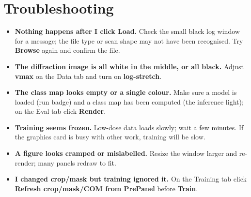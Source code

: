 \documentclass[11pt]{article}
\newcommand{\btn}[1]{\textbf{#1}}
\begin{document}
\section{Troubleshooting}
\begin{itemize}[itemsep=3pt]
\item \textbf{Nothing happens after I click Load.} Check the small black log
window for a message; the file type or scan shape may not have been recognised.
Try \btn{Browse} again and confirm the file.
\item \textbf{The diffraction image is all white in the middle, or all black.}
Adjust \textbf{vmax} on the Data tab and turn on \textbf{log-stretch}.
\item \textbf{The class map looks empty or a single colour.} Make sure a model is
loaded (run badge) and a class map has been computed (the inference light); on the
Eval tab click \btn{Render}.
\item \textbf{Training seems frozen.} Low-dose data loads slowly; wait a few
minutes. If the graphics card is busy with other work, training will be slow.
\item \textbf{A figure looks cramped or mislabelled.} Resize the window larger and
re-render; many panels redraw to fit.
\item \textbf{I changed crop/mask but training ignored it.} On the Training tab
click \btn{Refresh crop/mask/COM from PrePanel} before \btn{Train}.
\end{itemize}

\end{document}
